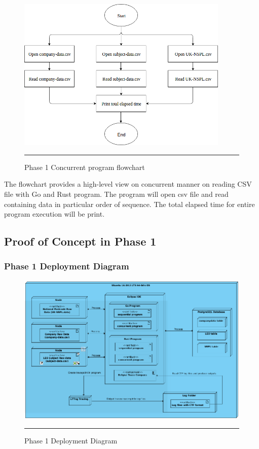 \begin{figure}[H]
	\centering
	\includegraphics[width=0.9\textwidth]{Figure/concurrent-read-csv.png}
	\rule{35em}{0.5pt}
	\caption[Phase 1 Concurrent program flowchart]{Phase 1 Concurrent program flowchart}
\end{figure}

The flowchart provides a high-level view on concurrent manner on reading CSV file with Go and Rust program. The program will open csv file and read containing data in particular order of sequence. The total elapsed time for entire program execution will be print. 

\subsection{Proof of Concept in Phase 1}

\subsubsection{Phase 1 Deployment Diagram}

\begin{figure}[H]
	\centering
	\includegraphics[width=1.0\textwidth]{Figure/dd-poc.png}
	\rule{35em}{0.5pt}
	\caption[Phase 1 Deployment Diagram]{Phase 1 Deployment Diagram}
\end{figure}


